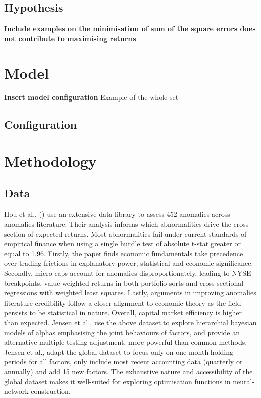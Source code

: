 \documentclass[12pt]{article}
\begin{document}
\subsection{Hypothesis}
\textbf{Include examples on the minimisation of sum of the square errors does not contribute to maximising returns}
\section{Model}
\textbf{Insert model configuration}
Example of the whole set
\subsection{Configuration}
\section{Methodology}
\subsection{Data}
Hou et al., (\citeyear{hou2020replicating}) use an extensive data library to assess 452 anomalies across anomalies literature.
Their analysis informs which abnormalities drive the cross section of expected returns. 
Most abnormalities fail under current standards of empirical finance when using a single hurdle test of absolute t-stat greater or equal to 1.96.
Firstly, the paper finds economic fundamentals take precedence over trading frictions in explanatory power, statistical and economic significance.
Secondly, micro-caps account for anomalies disproportionately, leading to NYSE breakpoints, value-weighted returns in both portfolio sorts and cross-sectional regressions with weighted least squares. 
Lastly, arguments in improving anomalies literature credibility follow a closer alignment to economic theory as the field persists to be statistical in nature.
Overall, capital market efficiency is higher than expected.
Jensen et al., \citeyear{jensen2021there} use the above dataset to explore hierarchial bayesian models of alphas emphasising the joint behaviours of factors, 
and provide an alternative multiple testing adjustment, more powerful than common methods.
Jensen et al., adapt the global dataset to focus only on one-month holding periods for all factors, only include most recent accounting data (quarterly or annually) and add 15 new factors.
The exhaustive nature and accessibility of the global dataset makes it well-suited for exploring optimisation functions in neural-network construction.
\end{document}
